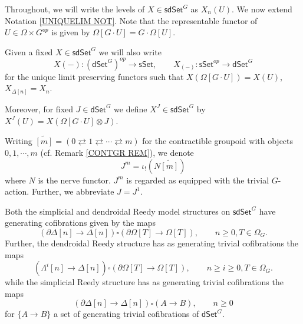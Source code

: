 \documentclass[a4paper,10pt
,draft
]{article}%
\begin{document}
Throughout, we will write the levels of 
$X \in \mathsf{sdSet}^G$ as 
$X_n(U)$. We now extend Notation \ref{UNIQUELIM NOT}.
Note that the representable functor of
$U \in \Omega \times G^{op}$ is given by $\Omega[G \cdot U] = G \cdot \Omega[U]$.

\begin{notation}\label{UNILIMDEN NOT}
	Given a fixed $X \in \mathsf{sdSet}^G$ we will also write
\[
	X(-)\colon \left(\mathsf{dSet}^G \right)^{op} \to \mathsf{sSet},\qquad 
	X_{(-)} \colon \mathsf{sSet}^{op} \to \mathsf{dSet}^{G}
\]
	for the unique limit preserving functors such that
	$X(\Omega[G \cdot U]) = X(U)$, $X_{\Delta[n]} = X_n$.
	
	Moreover, for fixed 
	$J \in \mathsf{dSet}^{G}$ we define
	$X^J \in \mathsf{sdSet}^G$ by
	$X^J(U) = X\left(\Omega[G \cdot U] \otimes J 
	\right)$.
\end{notation}



\begin{notation}\label{JM NOT}
      Writing
      $\widetilde{[m]} = 
      (0 \rightleftarrows 
      1 \rightleftarrows \cdots
      \rightleftarrows m)$
      for the contractible groupoid with objects 
      $0,1,\cdots,m$ (cf. Remark \ref{CONTGR REM}), we denote
      \[
            J^m = \iota_{!} (N \widetilde{[m]})
      \]
      where $N$ is the nerve functor.
      $J^m$ is regarded as equipped with the trivial $G$-action. Further, we abbreviate $J = J^1$.
\end{notation}


\begin{proposition}
	Both the simplicial and dendroidal Reedy model structures on 
	$\mathsf{sdSet}^G$ have generating cofibrations given by the maps
\begin{equation}\label{JOINTCOF EQ}
	\left(\partial \Delta [n] \to \Delta[n]\right)
		\square
	\left(\partial \Omega[T] \to \Omega[T]\right),
	\qquad
	n\geq 0, T \in \Omega_G.
\end{equation}
  Further, the dendroidal Reedy structure has as generating trivial cofibrations the maps
\begin{equation}\label{DENDTRIVCOF EQ}
	\left(\Lambda^i [n] \to \Delta[n]\right)
		\square
	\left(\partial \Omega[T] \to \Omega[T]\right),
	\qquad
	n\geq i \geq 0, T \in \Omega_G.
\end{equation}
while the simplicial Reedy structure has as generating trivial cofibrations the maps
\begin{equation}\label{SIMPTRIVCOF EQ}
	\left(\partial \Delta [n] \to \Delta[n]\right)
		\square
	\left(A \to B\right),
	\qquad
	n\geq 0
\end{equation}
for $\{A \to B\}$ a set of generating trivial cofibrations of
$\mathsf{dSet}^G$.
\end{proposition}
\end{document}
